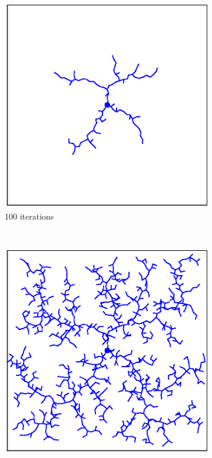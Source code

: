 \documentclass{ctuthesis}
\begin{document}
\begin{figure}[!ht]
  \centering
  \begin{subfigure}[b]{0.3\textwidth}
      \includegraphics[width=\textwidth]{figChap3/2RRTexpansion100.eps}
      \caption{100 iterations}
  \end{subfigure}
  ~ %
  \begin{subfigure}[b]{0.3\textwidth}
      \includegraphics[width=\textwidth]{figChap3/2RRTexpansion1000.eps}

\end{subfigure}
\end{figure}
\end{document}
